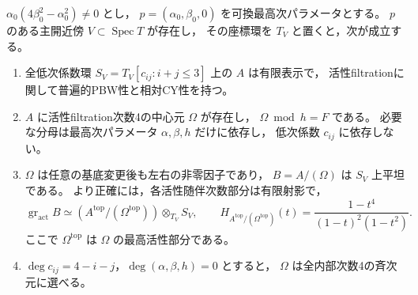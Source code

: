 \begin{theorem}\label{thm:elliptic-finite-central-family}
$\alpha_0(4\beta_0^2-\alpha_0^2)\ne0$ とし，
$p=(\alpha_0,\beta_0,0)$ を可換最高次パラメータとする。
$p$ のある主開近傍 $V\subset\operatorname{Spec}T$ が存在し，
その座標環を $T_V$ と置くと，次が成立する。
\begin{enumerate}
 \item 全低次係数環 $S_V=T_V[c_{ij}:i+j\le3]$ 上の $A$ は有限表示で，
       活性filtrationに関して普遍的PBW性と相対CY性を持つ。
 \item $A$ に活性filtration次数4の中心元 $\Omega$ が存在し，
       $\Omega\bmod h=F$ である。
       必要な分母は最高次パラメータ $\alpha,\beta,h$ だけに依存し，
       低次係数 $c_{ij}$ に依存しない。
 \item $\Omega$ は任意の基底変更後も左右の非零因子であり，
       $B=A/(\Omega)$ は $S_V$ 上平坦である。
       より正確には，各活性随伴次数部分は有限射影で，
       \[
        \operatorname{gr}_{\mathrm{act}} B
         \simeq (A^{\mathrm{top}}/(\Omega^{\mathrm{top}}))\otimes_{T_V}S_V,
        \qquad
        H_{A^{\mathrm{top}}/(\Omega^{\mathrm{top}})}(t)
          =\frac{1-t^4}{(1-t)^2(1-t^2)}.
       \]
       ここで $\Omega^{\mathrm{top}}$ は $\Omega$ の最高活性部分である。
 \item $\deg c_{ij}=4-i-j$，$\deg(\alpha,\beta,h)=0$ とすると，
       $\Omega$ は全内部次数4の斉次元に選べる。
\end{enumerate}
\end{theorem}
